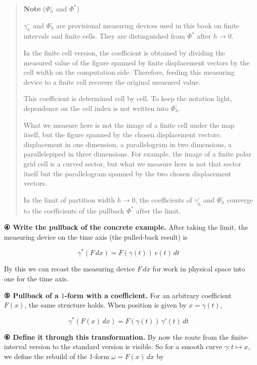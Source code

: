 \documentclass[a4paper,12pt,openany]{book}
\begin{document}
\begin{quote}
\textbf{Note} (\(\Phi_h^\square\) and \(\Phi^*\))

\(\gamma_h^\square\) and \(\Phi_h^\square\) are provisional measuring
devices used in this book on finite intervals and finite cells. They are
distinguished from \(\Phi^*\) after \(h\to0\).

In the finite cell version, the coefficient is obtained by dividing the
measured value of the figure spanned by finite displacement vectors by
the cell width on the computation side. Therefore, feeding this
measuring device to a finite cell recovers the original measured value.

This coefficient is determined cell by cell. To keep the notation light,
dependence on the cell index is not written into \(\Phi_h^\square\).

What we measure here is not the image of a finite cell under the map
itself, but the figure spanned by the chosen displacement vectors:
displacement in one dimension, a parallelogram in two dimensions, a
parallelepiped in three dimensions. For example, the image of a finite
polar grid cell is a curved sector, but what we measure here is not that
sector itself but the parallelogram spanned by the two chosen
displacement vectors.

In the limit of partition width \(h\to0\), the coefficients of
\(\gamma_h^\square\) and \(\Phi_h^\square\) converge to the coefficients
of the pullback \(\Phi^*\) after the limit.
\end{quote}

\textbf{④ Write the pullback of the concrete example.} After taking the
limit, the measuring device on the time axis (the pulled-back result) is

\[\gamma^*(F\,dx) = F(\gamma(t))\,v(t)\,dt\]

By this we can recast the measuring device \(F\,dx\) for work in
physical space into one for the time axis.

\textbf{⑤ Pullback of a $1$-form with a coefficient.} For an arbitrary
coefficient \(F(x)\), the same structure holds. When position is given
by \(x = \gamma(t)\),

\[
\gamma^*(F(x)\,dx)
=
F(\gamma(t))\,\gamma'(t)\,dt
\]

\textbf{⑥ Define it through this transformation.} By now the route from
the finite-interval version to the standard version is visible. So for a
smooth curve \(\gamma: t \mapsto x\), we define the rebuild of the
\(1\)-form \(\omega = F(x)\,dx\) by
\end{document}
